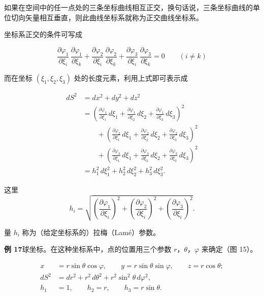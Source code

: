 \documentclass[11pt,a4paper,oneside]{ctexbook}
\begin{document}
如果在空间中的任一点处的三条坐标曲线相互正交，换句话说，三条坐标曲线的单位切向矢量相互垂直，则此曲线坐标系就称为正交曲线坐标系。

坐标系正交的条件可写成

\begin{equation}
\frac{\partial\varphi_1}{\partial\xi_i}\, \frac{\partial\varphi_1}{\partial\xi_k}
+ \frac{\partial\varphi_2}{\partial\xi_i}\, \frac{\partial\varphi_2}{\partial\xi_k}
+ \frac{\partial\varphi_3}{\partial\xi_i}\, \frac{\partial\varphi_3}{\partial\xi_k} = 0 \qquad (i \neq k)
\tag{1.62}
\end{equation}

而在坐标 $(\xi_1, \xi_2, \xi_3)$ 处的长度元素，利用上式即可表示成

\begin{equation*}
\begin{aligned}
dS^{2} &= dx^{2} + dy^{2} + dz^{2}\\
&= \left(\frac{\partial\varphi_1}{\partial\xi_1}\, d\xi_1 + \frac{\partial\varphi_1}{\partial\xi_2}\, d\xi_2 + \frac{\partial\varphi_1}{\partial\xi_3}\, d\xi_3\right)^{2}\\
&\qquad + \left(\frac{\partial\varphi_2}{\partial\xi_1}\, d\xi_1 + \frac{\partial\varphi_2}{\partial\xi_2}\, d\xi_2 + \frac{\partial\varphi_2}{\partial\xi_3}\, d\xi_3\right)^{2}\\
&\qquad + \left(\frac{\partial\varphi_3}{\partial\xi_1}\, d\xi_1 + \frac{\partial\varphi_3}{\partial\xi_2}\, d\xi_2 + \frac{\partial\varphi_3}{\partial\xi_3}\, d\xi_3\right)^{2}\\
&= h_1^{2}\, d\xi_1^{2} + h_2^{2}\, d\xi_2^{2} + h_3^{2}\, d\xi_3^{2}.
\end{aligned}
\end{equation*}

这里
\begin{equation*}
h_i = \sqrt{\left(\frac{\partial\varphi_1}{\partial\xi_i}\right)^{2} + \left(\frac{\partial\varphi_2}{\partial\xi_i}\right)^{2} + \left(\frac{\partial\varphi_3}{\partial\xi_i}\right)^{2}}.
\end{equation*}

量 $h_i$ 称为（给定坐标系的）拉梅（Lam\'e）参数。

\textbf{例 17}\quad 球坐标。在这种坐标系中，点的位置用三个参数 $r$，$\theta$，$\varphi$ 来确定（图 15）。

\begin{equation*}
\begin{aligned}
x &= r \sin\theta \cos\varphi, \qquad y = r \sin\theta \sin\varphi, \qquad z = r \cos\theta;\\
dS^{2} &= dr^{2} + r^{2}\, d\theta^{2} + r^{2} \sin^{2}\theta\, d\varphi^{2},\\
h_1 &= 1, \qquad h_2 = r, \qquad h_3 = r \sin\theta.
\end{aligned}
\end{equation*}
\end{document}
